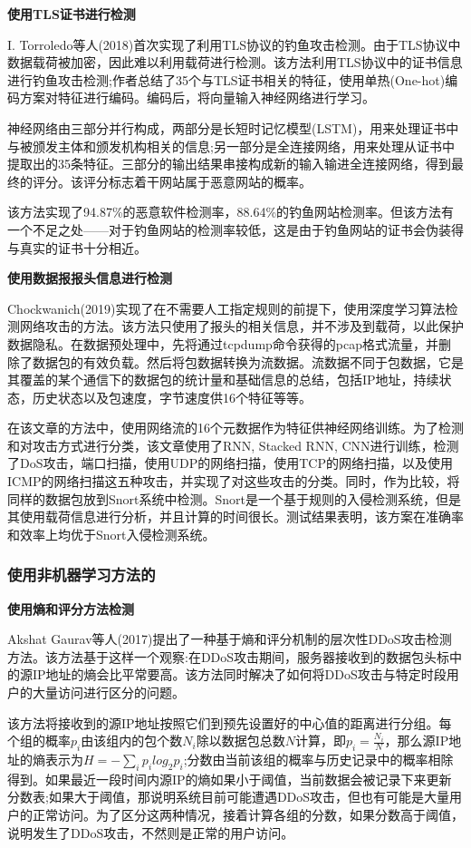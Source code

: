 \documentclass[12pt]{article} %
\begin{document}
\textbf{使用TLS证书进行检测}

I. Torroledo等人(2018)\cite{tls}首次实现了利用TLS协议的钓鱼攻击检测。由于TLS协议中数据载荷被加密，因此难以利用载荷进行检测。该方法利用TLS协议中的证书信息进行钓鱼攻击检测;作者总结了35个与TLS证书相关的特征，使用单热(One-hot)编码方案对特征进行编码。编码后，将向量输入神经网络进行学习。

神经网络由三部分并行构成，两部分是长短时记忆模型(LSTM)，用来处理证书中与被颁发主体和颁发机构相关的信息;另一部分是全连接网络，用来处理从证书中提取出的35条特征。三部分的输出结果串接构成新的输入输进全连接网络，得到最终的评分。该评分标志着干网站属于恶意网站的概率。

该方法实现了94.87\%的恶意软件检测率，88.64\%的钓鱼网站检测率。但该方法有一个不足之处——对于钓鱼网站的检测率较低，这是由于钓鱼网站的证书会伪装得与真实的证书十分相近。

\textbf{使用数据报报头信息进行检测}

Chockwanich(2019)\cite{Chockwanich}实现了在不需要人工指定规则的前提下，使用深度学习算法检测网络攻击的方法。该方法只使用了报头的相关信息，并不涉及到载荷，以此保护数据隐私。在数据预处理中，先将通过tcpdump命令获得的pcap格式流量，并删除了数据包的有效负载。然后将包数据转换为流数据。流数据不同于包数据，它是其覆盖的某个通信下的数据包的统计量和基础信息的总结，包括IP地址，持续状态，历史状态以及包速度，字节速度供16个特征等等。

在该文章的方法中，使用网络流的16个元数据作为特征供神经网络训练。为了检测和对攻击方式进行分类，该文章使用了RNN, Stacked RNN, CNN进行训练，检测了DoS攻击，端口扫描，使用UDP的网络扫描，使用TCP的网络扫描，以及使用ICMP的网络扫描这五种攻击，并实现了对这些攻击的分类。同时，作为比较，将同样的数据包放到Snort系统中检测。Snort是一个基于规则的入侵检测系统，但是其使用载荷信息进行分析，并且计算的时间很长。测试结果表明，该方案在准确率和效率上均优于Snort入侵检测系统。

\subsubsection{使用非机器学习方法的}
\label{nonml}

\textbf{使用熵和评分方法检测}

Akshat Gaurav等人(2017)\cite{entropy}提出了一种基于熵和评分机制的层次性DDoS攻击检测方法。该方法基于这样一个观察:在DDoS攻击期间，服务器接收到的数据包头标中的源IP地址的熵会比平常要高。该方法同时解决了如何将DDoS攻击与特定时段用户的大量访问进行区分的问题。

该方法将接收到的源IP地址按照它们到预先设置好的中心值的距离进行分组。每个组的概率$p_i$由该组内的包个数$N_i$除以数据包总数$N$计算，即$p_i = \frac{N_i}{N}$，那么源IP地址的熵表示为$H = -\sum_i p_ilog_2 p_i$;分数由当前该组的概率与历史记录中的概率相除得到。如果最近一段时间内源IP的熵如果小于阈值，当前数据会被记录下来更新分数表;如果大于阈值，那说明系统目前可能遭遇DDoS攻击，但也有可能是大量用户的正常访问。为了区分这两种情况，接着计算各组的分数，如果分数高于阈值，说明发生了DDoS攻击，不然则是正常的用户访问。
\end{document}
